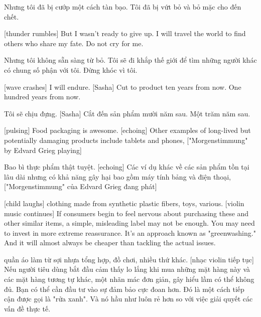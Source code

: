 \documentclass[a4paper]{article}
\begin{document}
	\begin{vietnamese-v2}
		Nhưng tôi đã bị cướp một cách tàn bạo.
		Tôi đã bị vứt bỏ và bỏ mặc cho đến chết.
	\end{vietnamese-v2}
	
	[thunder rumbles]
	But I wasn't ready to give up.
	I will travel the world
	to find others who share my fate.
	Do not cry for me.
	
	\begin{vietnamese-v2}
		Nhưng tôi không sẵn sàng từ bỏ.
		Tôi sẽ đi khắp thế giới
		để tìm những người khác có chung số phận với tôi.
		Đừng khóc vì tôi.
	\end{vietnamese-v2}
	
	[wave crashes]
	I will endure.
	[Sasha] Cut to product ten years from now.
	One hundred years from now.
	
	\begin{vietnamese-v2}
		[sóng vỗ]
		Tôi sẽ chịu đựng.
		[Sasha] Cắt đến sản phẩm mười năm sau.
		Một trăm năm sau.
	\end{vietnamese-v2}
	
	[pulsing]
	Food packaging is awesome. [echoing]
	Other examples of long-lived but potentially damaging products include tablets and phones, ["Morgenstimmung" by Edvard Grieg playing]
	
	\begin{vietnamese-v2}
		[pulsing]
		Bao bì thực phẩm thật tuyệt. [echoing]
		Các ví dụ khác về các sản phẩm tồn tại lâu dài nhưng có khả năng gây hại bao gồm máy tính bảng và điện thoại, ["Morgenstimmung" của Edvard Grieg đang phát]
	\end{vietnamese-v2}
	
	[child laughs]
	clothing made from synthetic plastic fibers,
	toys, various.
	[violin music continues]
	If consumers begin to feel nervous about purchasing these and other similar items, a simple, misleading label may not be enough.
	You may need to invest in more extreme reassurance.
	It's an approach known as "greenwashing."
	And it will almost always be cheaper than tackling the actual issues.
	
	\begin{vietnamese-v2}
		quần áo làm từ sợi nhựa tổng hợp,
		đồ chơi, nhiều thứ khác.
		[nhạc violin tiếp tục]
		Nếu người tiêu dùng bắt đầu cảm thấy lo lắng khi mua những mặt hàng này và các mặt hàng tương tự khác, một nhãn mác đơn giản, gây hiểu lầm có thể không đủ.
		Bạn có thể cần đầu tư vào sự đảm bảo cực đoan hơn.
		Đó là một cách tiếp cận được gọi là "rửa xanh".
		Và nó hầu như luôn rẻ hơn so với việc giải quyết các vấn đề thực tế.
	\end{vietnamese-v2}
	
\end{document}
